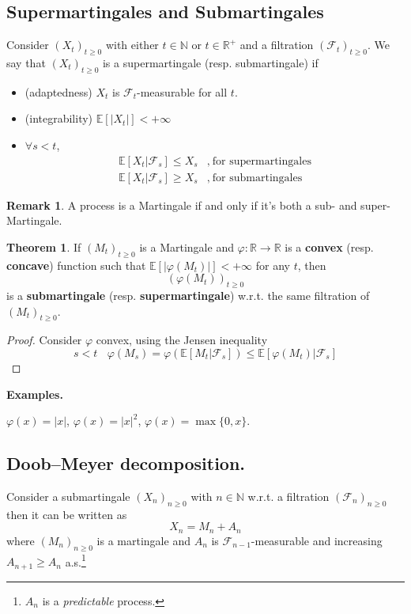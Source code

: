 \documentclass[10pt,a4paper]{article}
\theoremstyle{definition}
\newtheorem{teo}{Theorem}[section]
\newtheorem*{rem}{Remark}
\begin{document}
\subsection{Supermartingales and Submartingales}

Consider $( X_{t})_{t\geq 0}$ with either $t\in \mathbb{N}$ or $t\in \mathbb{R}^{+}$ and a filtration $(\mathcal{F}_{t})_{t\geq 0}$. We say that $( X_{t})_{t\geq 0}$ is a supermartingale (resp. submartingale) if
\begin{itemize}
	\item (adaptedness) $X_{t}$ is $\mathcal{F}_{t}$-measurable for all $t$.
	\item (integrability) $\mathbb{E}[| X_{t}| ] < +\infty $
	\item $\forall s< t$,\begin{align*}
	      \mathbb{E}[ X_{t} |\mathcal{F}_{s}] \leq X_{s} & ,\ \text{for supermartingales}\\
	      \mathbb{E}[ X_{t} |\mathcal{F}_{s}] \geq X_{s} & ,\ \text{for submartingales}
	\end{align*}
\end{itemize}
\begin{rem}
	A process is a Martingale if and only if it's both a sub- and super- Martingale.
\end{rem}
\begin{teo}
	If $( M_{t})_{t\geq 0}$ is a Martingale and $\varphi :\mathbb{R}\rightarrow \mathbb{R}$ is a \textbf{convex} (resp. \textbf{concave}) function such that $\mathbb{E}[| \varphi ( M_{t})| ] < +\infty $ for any $t$, then
	\begin{equation*}
		( \varphi ( M_{t}))_{t\geq 0}
	\end{equation*}
	is a \textbf{submartingale} (resp. \textbf{supermartingale}) w.r.t. the same filtration of $( M_{t})_{t\geq 0}$.
\end{teo}
\begin{proof}
	Consider $\varphi $ convex, using the Jensen inequality
	\begin{equation*}
		s< t\ \ \ \ \varphi ( M_{s}) =\varphi (\mathbb{E}[ M_{t} |\mathcal{F}_{s}]) \leq \mathbb{E}[ \varphi ( M_{t}) |\mathcal{F}_{s}]
	\end{equation*}
\end{proof}
\textbf{Examples.}

$\varphi ( x) =| x| $, $\varphi ( x) =| x| ^{2}$, $\varphi ( x) =\max\{0,x\}$.
\subsection{Doob--Meyer decomposition.}

Consider a submartingale $( X_{n})_{n\geq 0}$ with $n\in \mathbb{N}$ w.r.t. a filtration $(\mathcal{F}_{n})_{n\geq 0}$ then it can be written as
\begin{equation*}
	X_{n} =M_{n} +A_{n}
\end{equation*}
where $( M_{n})_{n\geq 0}$ is a martingale and $A_{n}$ is $\mathcal{F}_{n-1}$-measurable and increasing $A_{n+1} \geq A_{n}$ a.s.\footnote{$A_{n}$ is a \textit{predictable} process.}
\end{document}
